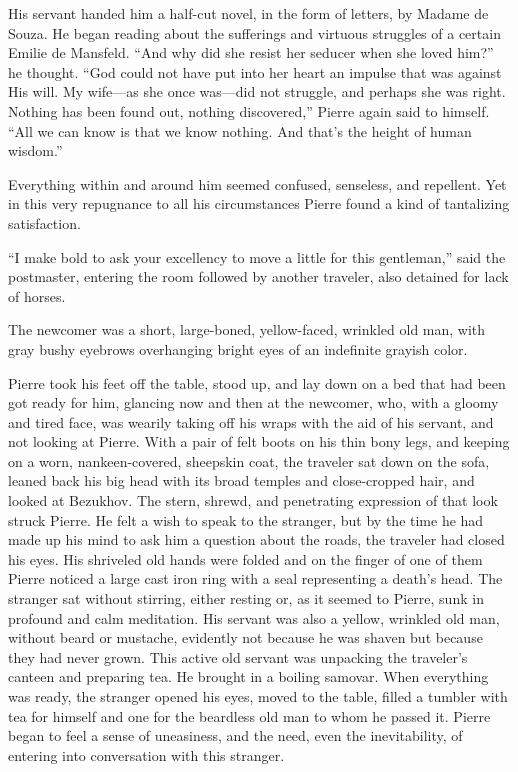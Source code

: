 His servant handed him a half-cut novel, in the form of letters,
by Madame de Souza. He began reading about the sufferings and
virtuous struggles of a certain Emilie de Mansfeld. ``And why did
she resist her seducer when she loved him?'' he thought. ``God
could not have put into her heart an impulse that was against His
will. My wife---as she once was---did not struggle, and perhaps
she was right. Nothing has been found out, nothing discovered,''
Pierre again said to himself. ``All we can know is that we know
nothing. And that's the height of human wisdom.''

Everything within and around him seemed confused, senseless, and
repellent. Yet in this very repugnance to all his circumstances
Pierre found a kind of tantalizing satisfaction.

``I make bold to ask your excellency to move a little for this
gentleman,'' said the postmaster, entering the room followed by
another traveler, also detained for lack of horses.

The newcomer was a short, large-boned, yellow-faced, wrinkled old
man, with gray bushy eyebrows overhanging bright eyes of an
indefinite grayish color.

Pierre took his feet off the table, stood up, and lay down on a
bed that had been got ready for him, glancing now and then at the
newcomer, who, with a gloomy and tired face, was wearily taking
off his wraps with the aid of his servant, and not looking at
Pierre. With a pair of felt boots on his thin bony legs, and
keeping on a worn, nankeen-covered, sheepskin coat, the traveler
sat down on the sofa, leaned back his big head with its broad
temples and close-cropped hair, and looked at Bezukhov. The
stern, shrewd, and penetrating expression of that look struck
Pierre. He felt a wish to speak to the stranger, but by the time
he had made up his mind to ask him a question about the roads,
the traveler had closed his eyes. His shriveled old hands were
folded and on the finger of one of them Pierre noticed a large
cast iron ring with a seal representing a death's head. The
stranger sat without stirring, either resting or, as it seemed to
Pierre, sunk in profound and calm meditation. His servant was
also a yellow, wrinkled old man, without beard or mustache,
evidently not because he was shaven but because they had never
grown.  This active old servant was unpacking the traveler's
canteen and preparing tea. He brought in a boiling samovar. When
everything was ready, the stranger opened his eyes, moved to the
table, filled a tumbler with tea for himself and one for the
beardless old man to whom he passed it. Pierre began to feel a
sense of uneasiness, and the need, even the inevitability, of
entering into conversation with this stranger.

